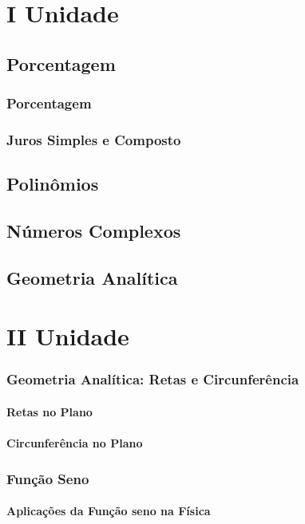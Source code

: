\documentclass[12pt,a4paper]{book}
\begin{document}
\part*{I Unidade}
\chapter{Porcentagem}
	\section{Porcentagem}
	\section{Juros Simples e Composto}

\chapter{Polinômios}
\chapter{Números Complexos}
\chapter{Geometria Analítica}
	
\part*{II Unidade}
\section{Geometria Analítica: Retas e Circunferência}

	\subsection{Retas no Plano}
	\subsection{Circunferência no Plano}

\section{Função Seno}

	\subsection{Aplicações da Função seno na Física}	
	
\end{document}
